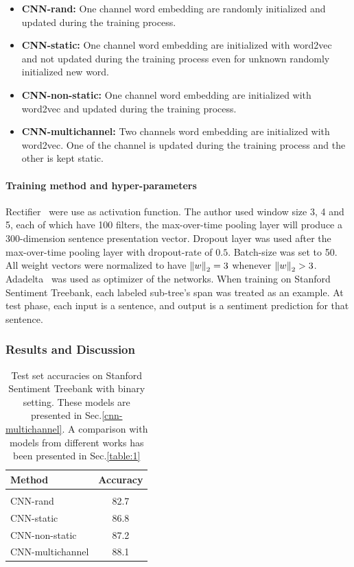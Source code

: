 \begin{itemize}
      \item \textbf{CNN-rand:} One channel word embedding are randomly initialized and updated during the training process.\label{cnn-rand}
    \item \textbf{CNN-static:} One channel word embedding are initialized with word2vec~\cite{word2vec} and not updated during the training process even for unknown randomly initialized new word.\label{cnn-static}
    \item \textbf{CNN-non-static:} One channel word embedding are initialized with word2vec and updated during the training process.\label{cnn-non-static}
    \item \textbf{CNN-multichannel:} Two channels word embedding are initialized with word2vec. One of the channel is updated during the training process and the other is kept static.\label{cnn-multichannel}
\end{itemize}
\paragraph{Training method and hyper-parameters} 
Rectifier~\cite{rectifier} were use as activation function.
The author used window size 3, 4 and 5, each of which have 100 filters, the max-over-time pooling layer will produce a 300-dimension sentence presentation vector. 
Dropout layer was used after the max-over-time pooling layer with dropout-rate of \(0.5\).  
Batch-size was set to 50. 
All weight vectors were normalized to have \(\left\lVert w \right\rVert_2 = 3\) whenever \(\left\lVert w \right\rVert_2 > 3\). 
Adadelta~\cite{adadelta} was used as optimizer of the networks.
When training on Stanford Sentiment Treebank, each labeled sub-tree's span was treated as an example.
At test phase, each input is a sentence, and output is a sentiment prediction for that sentence.

\subsubsection{Results and Discussion}\label{kimcnn-drawback}
\begin{table}[H]
\centering
\begin{tabular}{l c} 
 \hline
 \hline 
 Method & Accuracy \\ [0.5ex] 
 \hline
 \hline
 \\  
 CNN-rand & 82.7 \\ 
 CNN-static & 86.8 \\ 
 CNN-non-static & 87.2 \\ 
 CNN-multichannel & 88.1 \\ 
 \hline
 \hline
\end{tabular}
\caption[CNN test result]{Test set accuracies on Stanford Sentiment Treebank with binary setting. These models are presented in Sec.\ref{cnn-multichannel}.
A comparison with models from different works has been presented in Sec.\ref{table:1}}
\label{table:KimCNN}
\end{table}

